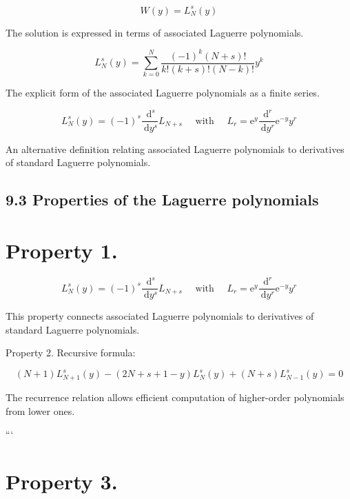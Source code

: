 \documentclass[10pt]{article}
\begin{document}
\begin{equation*}
W(y)=L_{N}^{s}(y) \tag{9.72}
\end{equation*}

The solution is expressed in terms of associated Laguerre polynomials.

\begin{equation*}
L_{N}^{s}(y)=\sum_{k=0}^{N} \frac{(-1)^{k}(N+s)!}{k!(k+s)!(N-k)!} y^{k} \tag{9.73}
\end{equation*}

The explicit form of the associated Laguerre polynomials as a finite series.

\begin{equation*}
L_{N}^{s}(y)=(-1)^{s} \frac{\mathrm{~d}^{s}}{\mathrm{~d} y^{s}} L_{N+s} \quad \text { with } \quad L_{r}=\mathrm{e}^{y} \frac{\mathrm{~d}^{r}}{\mathrm{~d} y^{r}} \mathrm{e}^{-y} y^{r} \tag{9.74}
\end{equation*}

An alternative definition relating associated Laguerre polynomials to derivatives of standard Laguerre polynomials.

\subsection*{9.3 Properties of the Laguerre polynomials}
\section*{Property 1.}

\begin{equation*}
L_{N}^{s}(y)=(-1)^{s} \frac{\mathrm{~d}^{s}}{\mathrm{~d} y^{s}} L_{N+s} \quad \text { with } \quad L_{r}=\mathrm{e}^{y} \frac{\mathrm{~d}^{r}}{\mathrm{~d} y^{r}} \mathrm{e}^{-y} y^{r} \tag{9.75}
\end{equation*}

This property connects associated Laguerre polynomials to derivatives of standard Laguerre polynomials.

Property 2. Recursive formula:

\begin{equation*}
(N+1) L_{N+1}^{s}(y)-(2 N+s+1-y) L_{N}^{s}(y)+(N+s) L_{N-1}^{s}(y)=0 \tag{9.76}
\end{equation*}

The recurrence relation allows efficient computation of higher-order polynomials from lower ones.

```
\section*{Property 3.}
\end{document}
